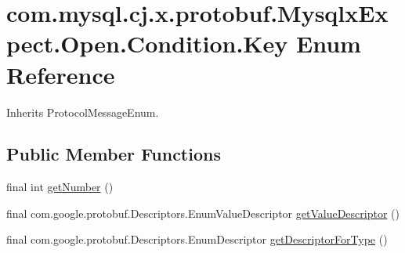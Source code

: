 \hypertarget{enumcom_1_1mysql_1_1cj_1_1x_1_1protobuf_1_1_mysqlx_expect_1_1_open_1_1_condition_1_1_key}{}\section{com.\+mysql.\+cj.\+x.\+protobuf.\+Mysqlx\+Expect.\+Open.\+Condition.\+Key Enum Reference}
\label{enumcom_1_1mysql_1_1cj_1_1x_1_1protobuf_1_1_mysqlx_expect_1_1_open_1_1_condition_1_1_key}


Inherits Protocol\+Message\+Enum.

\subsection*{Public Member Functions}
\begin{DoxyCompactItemize}
\item 
final int \mbox{\hyperlink{enumcom_1_1mysql_1_1cj_1_1x_1_1protobuf_1_1_mysqlx_expect_1_1_open_1_1_condition_1_1_key_a69f059d42ce43a0a9c43b3bc9f7bb14c}{get\+Number}} ()
\item 
final com.\+google.\+protobuf.\+Descriptors.\+Enum\+Value\+Descriptor \mbox{\hyperlink{enumcom_1_1mysql_1_1cj_1_1x_1_1protobuf_1_1_mysqlx_expect_1_1_open_1_1_condition_1_1_key_a32e60913b503b7242ee3c60e68f2ac89}{get\+Value\+Descriptor}} ()
\item 
final com.\+google.\+protobuf.\+Descriptors.\+Enum\+Descriptor \mbox{\hyperlink{enumcom_1_1mysql_1_1cj_1_1x_1_1protobuf_1_1_mysqlx_expect_1_1_open_1_1_condition_1_1_key_a5c1e4aa8b4579e6d6a744324bb330ca2}{get\+Descriptor\+For\+Type}} ()
\end{DoxyCompactItemize}
